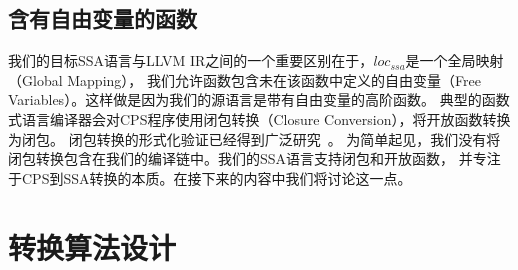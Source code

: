 \subsection{含有自由变量的函数}

我们的目标SSA语言与LLVM IR之间的一个重要区别在于，$loc_{ssa}$是一个全局映射（Global Mapping），
我们允许函数包含未在该函数中定义的自由变量（Free Variables）。这样做是因为我们的源语言是带有自由变量的高阶函数。
典型的函数式语言编译器会对CPS程序使用闭包转换（Closure Conversion），将开放函数转换为闭包。
闭包转换的形式化验证已经得到广泛研究~\cite{paraskevopoulou2019closure,wang-esop2016}。
为简单起见，我们没有将闭包转换包含在我们的编译链中。我们的SSA语言支持闭包和开放函数，
并专注于CPS到SSA转换的本质。在接下来的内容中我们将讨论这一点。

\section{转换算法设计} \label{sec:cpsssatrans}